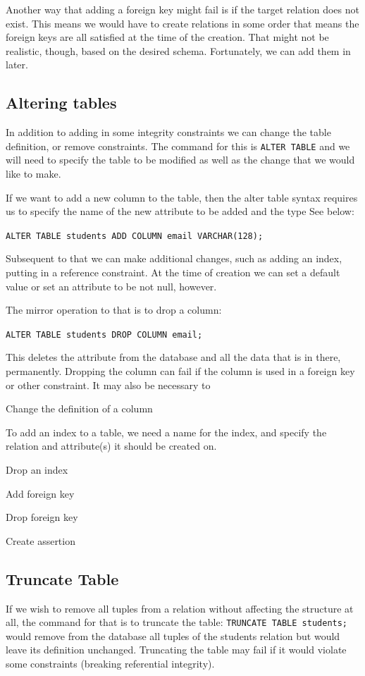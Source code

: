 Another way that adding a foreign key might fail is if the target relation does not exist. This means we would have to create relations in some order that means the foreign keys are all satisfied at the time of the creation. That might not be realistic, though, based on the desired schema. Fortunately, we can add them in later.

\subsection*{Altering tables}

In addition to adding in some integrity constraints we can change the table definition, or remove constraints. The command for this is \texttt{ALTER TABLE} and we will need to specify the table to be modified as well as the change that we would like to make. 

If we want to add a new column to the table, then the alter table syntax requires us to specify the name of the new attribute to be added and the type See below:

\texttt{ALTER TABLE students ADD COLUMN email VARCHAR(128);}

Subsequent to that we can make additional changes, such as adding an index, putting in a reference constraint. At the time of creation we can set a default value or set an attribute to be not null, however.

The mirror operation to that is to drop a column: 

\texttt{ALTER TABLE students DROP COLUMN email;}

This deletes the attribute from the database and all the data that is in there, permanently. Dropping the column can fail if the column is used in a foreign key or other constraint. It may also be necessary to 

Change the definition of a column

To add an index to a table, we need a name for the index, and specify the relation and attribute(s) it should be created on.


Drop an index

Add foreign key

Drop foreign key

Create assertion 


\subsection*{Truncate Table}

If we wish to remove all tuples from a relation without affecting the structure at all, the command for that is to truncate the table: \texttt{TRUNCATE TABLE students;} would remove from the database all tuples of the students relation but would leave its definition unchanged. Truncating the table may fail if it would violate some constraints (breaking referential integrity).

